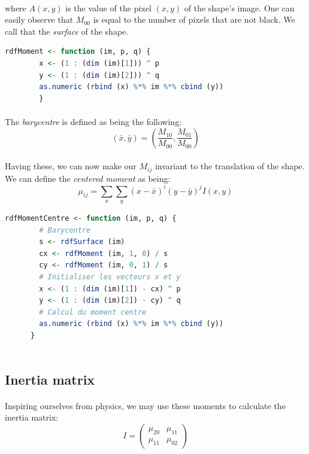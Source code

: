 \paragraph{}
where $A(x, y)$ is the value of the pixel $(x, y)$ of the shape's image. One can easily observe that $M_{00}$ is equal to the number of pixels that are not black. We call that the \emph{surface} of the shape.

\begin{lstlisting}[language=R, caption=Calculating the moment of a shape]
    rdfMoment <- function (im, p, q) {
        x <- (1 : (dim (im)[1])) ^ p
        y <- (1 : (dim (im)[2])) ^ q
        as.numeric (rbind (x) %*% im %*% cbind (y))
        }
\end{lstlisting}

\paragraph{}
The \emph{barycentre} is defined as being the following:
$$(\bar{x}, \bar{y}) = (\frac{M_{10}} {M_{00}}, \frac{M_{01}} {M_{00}})$$

\paragraph{}
Having these, we can now make our $M_{ij}$ invariant to the translation of the shape. We can define the \emph{centered moment} as being:
$$\mu_{ij} = \sum_{x}\sum_{y} (x - \bar{x})^i(y - \bar{y})^j I(x, y)$$

\begin{lstlisting}[language=R, caption=Calculating centered moments]
    rdfMomentCentre <- function (im, p, q) {
        # Barycentre
        s <- rdfSurface (im)
        cx <- rdfMoment (im, 1, 0) / s
        cy <- rdfMoment (im, 0, 1) / s
        # Initialiser les vecteurs x et y
        x <- (1 : (dim (im)[1]) - cx) ^ p
        y <- (1 : (dim (im)[2]) - cy) ^ q
        # Calcul du moment centre
        as.numeric (rbind (x) %*% im %*% cbind (y))
      }
      
\end{lstlisting}

\subsection{Inertia matrix}
\paragraph{}
Inspiring ourselves from physics, we may use these moments to calculate the inertia matrix:
$$ I = 
\begin{pmatrix}
    \mu_{20} & \mu_{11}\\
    \mu_{11} & \mu_{02}
\end{pmatrix}
$$

